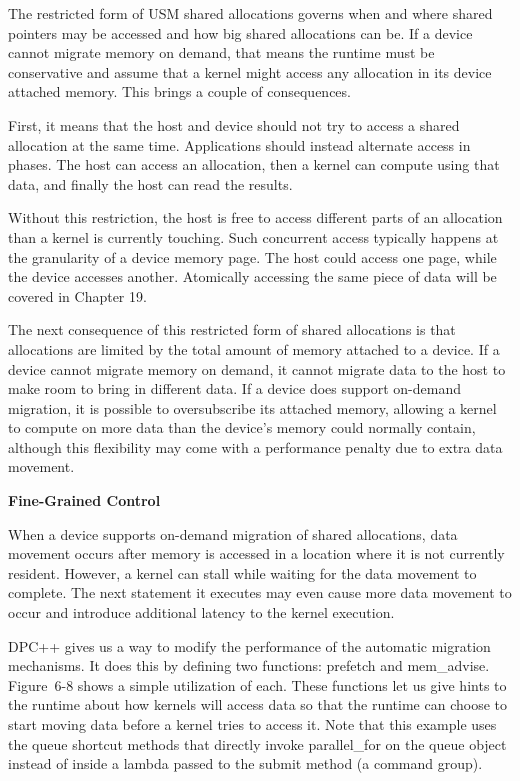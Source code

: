 The restricted form of USM shared allocations governs when and where shared pointers may be accessed and how big shared allocations can be. If a device cannot migrate memory on demand, that means the runtime must be conservative and assume that a kernel might access any allocation in its device attached memory. This brings a couple of consequences.\par

First, it means that the host and device should not try to access a shared allocation at the same time. Applications should instead alternate access in phases. The host can access an allocation, then a kernel can compute using that data, and finally the host can read the results.\par

Without this restriction, the host is free to access different parts of an allocation than a kernel is currently touching. Such concurrent access typically happens at the granularity of a device memory page. The host could access one page, while the device accesses another. Atomically accessing the same piece of data will be covered in Chapter 19.\par

The next consequence of this restricted form of shared allocations is that allocations are limited by the total amount of memory attached to a device. If a device cannot migrate memory on demand, it cannot migrate data to the host to make room to bring in different data. If a device does support on-demand migration, it is possible to oversubscribe its attached memory, allowing a kernel to compute on more data than the device’s memory could normally contain, although this flexibility may come with a performance penalty due to extra data movement.\par

\hspace*{\fill} \par %
\textbf{Fine-Grained Control}

When a device supports on-demand migration of shared allocations, data movement occurs after memory is accessed in a location where it is not currently resident. However, a kernel can stall while waiting for the data movement to complete. The next statement it executes may even cause more data movement to occur and introduce additional latency to the kernel execution.\par

DPC++ gives us a way to modify the performance of the automatic migration mechanisms. It does this by defining two functions: prefetch and mem\_advise. Figure 6-8 shows a simple utilization of each. These functions let us give hints to the runtime about how kernels will access data so that the runtime can choose to start moving data before a kernel tries to access it. Note that this example uses the queue shortcut methods that directly invoke parallel\_for on the queue object instead of inside a lambda passed to the submit method (a command group).\par

